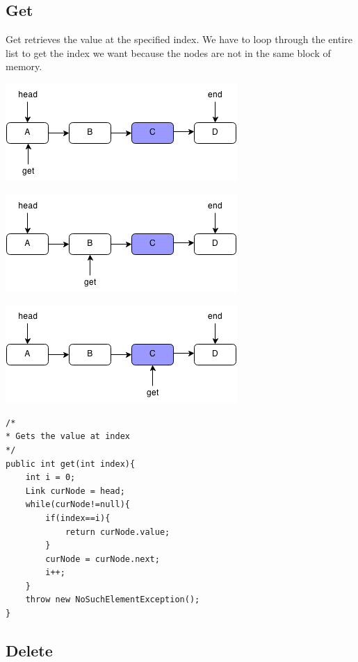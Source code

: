 \documentclass[11pt,oneside]{book}
\makeatletter
\def\maxwidth#1{\ifdim\Gin@nat@width>#1 #1\else\Gin@nat@width\fi}
\makeatother
\begin{document}
\subsection{Get}

Get retrieves the value at the specified index. We have to loop through the entire list to get the index we want because the nodes are not in the same block of memory.

\includegraphics[width=\maxwidth{\textwidth}]{linkedlistget.png}

\includegraphics[width=\maxwidth{\textwidth}]{linkedlistget2.png}

\includegraphics[width=\maxwidth{\textwidth}]{linkedlistget3.png}

\begin{lstlisting}
/*
* Gets the value at index
*/
public int get(int index){
    int i = 0;
    Link curNode = head;
    while(curNode!=null){
        if(index==i){
            return curNode.value;
        }
        curNode = curNode.next;
        i++;
    }
    throw new NoSuchElementException();
}
\end{lstlisting}

\subsection{Delete}
\end{document}
